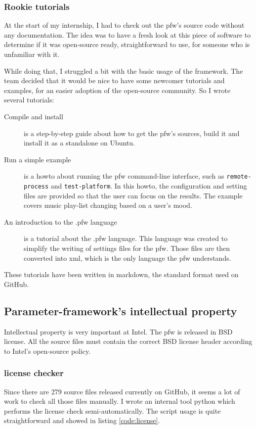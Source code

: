 \subsubsection{Rookie tutorials}\label{sec:tutorials}

At the start of my internship, I had to check out the \gls{pfw}'s
source code without any documentation. The idea was to have a fresh look at
this piece of software to determine if it was open-source ready, straightforward
to use, for someone who is unfamiliar with it.

While doing that, I struggled a bit with the basic usage of the framework. The
team decided that it would be nice to have some newcomer tutorials and examples,
for an easier adoption of the open-source community. So I wrote several
tutorials:
\begin{description}
    \item[Compile and install]
        is a step-by-step guide about how to get the \gls{pfw}'s sources,
        build it and install it as a standalone on Ubuntu.
    \item[Run a simple example]
        is a howto about running the \gls{pfw} command-line interface,
        such as \lstinline{remote-process} and \lstinline {test-platform}.  In
        this howto, the configuration and setting files are provided so that
        the user can focus on the results. The example covers music play-list
        changing based on a user's mood.
    \item[An introduction to the .pfw language]\label{desc:pfw-language}
        is a tutorial about the .pfw language. This language was
        created to simplify the writing of settings files for the
        \gls{pfw}. Those files are then converted into \gls{xml}, which is
        the only language the \gls{pfw} understands.
\end{description}
These tutorials have been written in \gls{markdown}, the standard format used
on \gls{GitHub}.

\subsection{Parameter-framework's intellectual property}
Intellectual property is very important at Intel. The \gls{pfw} is released in
BSD license. All the source files must contain the correct BSD license header according
to Intel's open-source policy.

\subsubsection{license checker}
Since there are 279 source files released currently on \gls{GitHub}, it seems a lot of
work to check all those files manually.
I wrote an internal tool \gls{python} which performs the license check semi-automatically.
The script usage is quite straightforward and showed in listing \ref{code:license}.

